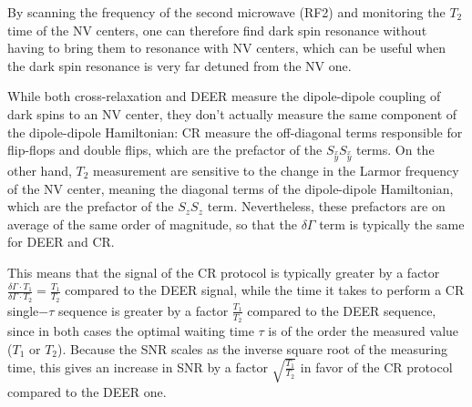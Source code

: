 \documentclass[a4paper]{report}
\begin{document}
By scanning the frequency of the second microwave (RF2) and monitoring the $T_2$ time of the NV centers, one can therefore find dark spin resonance without having to bring them to resonance with NV centers, which can be useful when the dark spin resonance is very far detuned from the NV one.

While both cross-relaxation and DEER measure the dipole-dipole coupling of dark spins to an NV center, they don't actually measure the same component of the dipole-dipole Hamiltonian: CR measure the off-diagonal terms responsible for flip-flops and double flips, which are the prefactor of the $S_{\overset{x}{y}} S_{\overset{x}{y}}$ terms. On the other hand, $T_2$ measurement are sensitive to the change in the Larmor frequency of the NV center, meaning the diagonal terms of the dipole-dipole Hamiltonian, which are the prefactor of the $S_z S_z$ term. Nevertheless, these prefactors are on average of the same order of magnitude, so that the $\delta \Gamma$ term is typically the same for DEER and CR.

This means that the signal of the CR protocol is typically greater by a factor $\frac{\delta \Gamma \cdot T_1}{\delta \Gamma \cdot T_2}=\frac{T_1}{T_2}$ compared to the DEER signal, while the time it takes to perform a CR single$-\tau$ sequence is greater by a factor $\frac{T_1}{T_2}$ compared to the DEER sequence, since in both cases the optimal waiting time $\tau$ is of the order the measured value ($T_1$ or $T_2$). Because the SNR scales as the inverse square root of the measuring time, this gives an increase in SNR by a factor $\sqrt{\frac{T_1}{T_2}}$ in favor of the CR protocol compared to the DEER one.







\printbibliography
\end{document}
